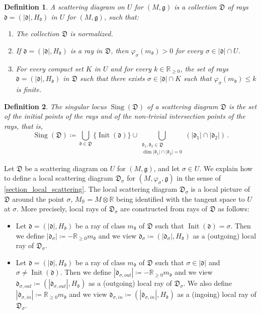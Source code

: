 \documentclass[12pt, a4paper]{amsart}
\newtheorem{defn}{Definition}[section]
\newcommand\R{\mathbb R}
\newcommand\fd{\mathfrak d}
\newcommand\fD{\mathfrak D}
\newcommand\fg{\mathfrak g}
\newcommand\Sing{\operatorname{Sing}}
\newcommand\Init{\operatorname{Init}}
\begin{document}
\begin{defn}\label{def_scattering}
A \emph{scattering diagram} on $U$
for $(M,\fg)$ is a collection $\fD$ of rays
$\fd=(|\fd|,H_\fd)$ in $U$ for $(M,\fg)$, such that:
\begin{enumerate}
	\item[(i)] The collection $\fD$ is normalized.
    \item[(ii)] If $\fd=(|\fd|, H_\fd)$ is a ray in $\fD$, then $\varphi_\sigma(m_\fd)>0$ for every $\sigma \in |\fd|\cap U$.
    \item[(iii)] For every compact set $K$ in $U$ and for every $k \in \R_{\geqslant 0}$, the set of rays
$\fd=(|\fd|, H_\fd)$ in $\fD$ such that there exists $\sigma \in |\fd| \cap K$
such that $\varphi_\sigma (m_\fd)\leqslant k$ is finite.
\end{enumerate}
\end{defn}




\begin{defn}
The \emph{singular locus} $\Sing(\fD)$ of a scattering diagram $\fD$ is the set of the 
initial points of the rays and of the non-trivial intersection points of the rays, 
that is,
\[\Sing(\fD)\coloneq \bigcup_{\fd \in \fD} \{\Init(\fd)\} \cup \bigcup_{\substack{\fd_1, \fd_2 \in \fD \\ \dim |\fd_1| \cap |\fd_2| =0}} (|\fd_1| \cap |\fd_2|) \,.\]
\end{defn}

Let $\fD$ be a scattering diagram on $U$ for $(M, \fg)$, 
and let $\sigma \in U$. We explain how to define a local scattering 
diagram $\fD_\sigma$ for $(M, \varphi_\sigma, \fg)$ in the sense of \cref{section_local_scattering}.
The local scattering diagram $\fD_\sigma$ is a local picture of $\fD$ around the point $\sigma$, $M_\R=M \otimes \R$ being identified with the tangent space to $U$ at $\sigma$.
More precisely, local rays of $\fD_\sigma$ are constructed from rays of $\fD$ as follows:
\begin{itemize}
\item[(i)]
Let $\fd=(|\fd|, H_\fd)$ be a ray of class $m_\fd$ of $\fD$ such that $\Init(\fd)=\sigma$. Then we define 
$|\fd_\sigma| \coloneq -\R_{\geqslant 0}m_\fd$ and we view $\fd_\sigma \coloneq (|\fd_\sigma|, H_\fd)$ as a (outgoing) local ray of $\fD_\sigma$.
\item[(ii)]
Let $\fd=(|\fd|,H_\fd)$ be a ray of class $m_\fd$ of $\fD$ such that $\sigma \in |\fd|$ and 
$\sigma \neq \Init(\fd)$. Then we define $|\fd_{\sigma,out}| \coloneq -\R_{\geqslant 0}m_\fd$ and we view $\fd_{\sigma,out} \coloneq (|\fd_{\sigma,out}|, H_\fd)$ as a (outgoing) local ray of $\fD_\sigma$. We also define 
$|\fd_{\sigma,in}| \coloneq \R_{\geqslant 0}m_\fd$ and we view 
$\fd_{\sigma,in} \coloneq (|\fd_{\sigma,in}|, H_\fd)$ as a (ingoing) local ray of $\fD_\sigma$.
\end{itemize}
\end{document}
